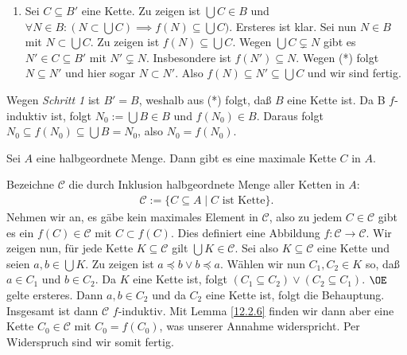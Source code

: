 \documentclass[../../main.tex]{subfiles}
\begin{document}
\begin{cproof}
\begin{tcolorbox}[arc=0mm, boxrule=0.2mm]
\begin{enumerate}[\normalfont(a)]
				\item Sei $C\subseteq B'$ eine Kette. Zu zeigen ist $\bigcup C\in B$ und $\forall N\in B: (N\subset \bigcup C)\implies f(N)\subseteq \bigcup C)$. Ersteres ist klar. Sei nun $N\in B$ mit $N\subset \bigcup C$. Zu zeigen ist $f(N)\subseteq \bigcup C$. Wegen $\bigcup C\subsetneq N$ gibt es $N'\in C\subseteq B'$ mit $N'\subsetneq N$. Insbesondere ist $f(N')\subseteq N$. Wegen (*) folgt $N\subseteq N'$ und hier sogar $N\subset N'$. Also $f(N)\subseteq N'\subseteq \bigcup C$ und wir sind fertig.
			\end{enumerate}
	\end{tcolorbox}
	\noindent Wegen \textit{Schritt 1} ist $B'=B$, weshalb aus (*) folgt, daß $B$ eine Kette ist. Da B $f$-induktiv ist, folgt $N_0:=\bigcup B\in B$ und $f(N_0)\in B$. Daraus folgt $N_0\subseteq f(N_0)\subseteq \bigcup B=N_0$, also $N_0=f(N_0)$.
\end{cproof}

\begin{lem}\label{12.2.7}
	Sei $A$ eine halbgeordnete Menge. Dann gibt es eine maximale Kette $C$ in $A$.
\end{lem}
\begin{cproof}
	Bezeichne $\mathcal{C}$ die durch Inklusion halbgeordnete Menge aller Ketten in $A$:
	\begin{align*}
		\mathcal{C}:=\{C\subseteq A\mid C\text{ ist Kette}\}.
	\end{align*}
	Nehmen wir an, es gäbe kein maximales Element in $\mathcal{C}$, also zu jedem $C\in\mathcal{C}$ gibt es ein $f(C)\in\mathcal{C}$ mit $C\subset f(C)$. Dies definiert eine Abbildung $f: \mathcal{C}\rightarrow \mathcal{C}$. Wir zeigen nun, für jede Kette $K\subseteq\mathcal{C}$ gilt $\bigcup K\in \mathcal{C}$. Sei also $K\subseteq\mathcal{C}$ eine Kette und seien $a,b\in \bigcup K$. Zu zeigen ist $a\preceq b\lor b\preceq a$. Wählen wir nun $C_1,C_2\in K$ so, daß $a\in C_1$ und $b\in C_2$. Da $K$ eine Kette ist, folgt $(C_1\subseteq C_2)\lor (C_2\subseteq C_1)$. $\OE$ gelte ersteres. Dann $a,b\in C_2$ und da $C_2$ eine Kette ist, folgt die Behauptung.\\
				
	Insgesamt ist dann $\mathcal{C}$ $f$-induktiv. Mit Lemma \eqref{12.2.6} finden wir dann aber eine Kette $C_0\in\mathcal{C}$ mit $C_0=f(C_0)$, was unserer Annahme widerspricht. Per Widerspruch sind wir somit fertig.
\end{cproof}
\end{document}
